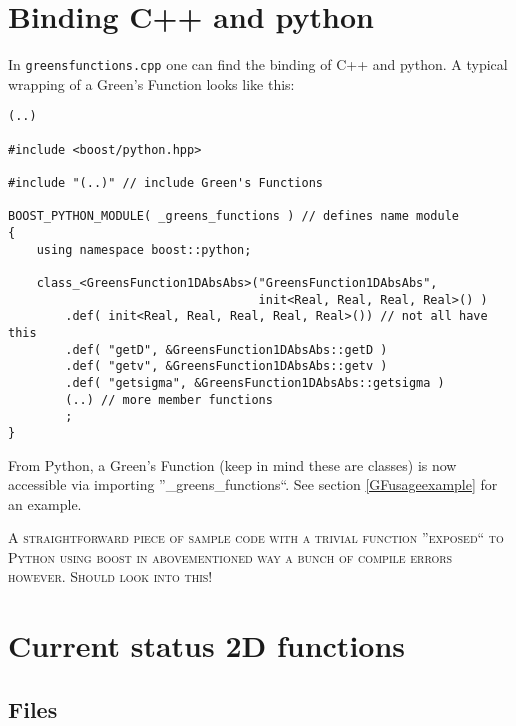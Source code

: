 \documentclass[a4paper,10pt]{article}
\begin{document}
\section{Binding C++ and python}
 
In \texttt{greensfunctions.cpp} one can find the binding of C++ and python. A typical wrapping of a Green's Function looks like this:

\begin{verbatim}
(..)

#include <boost/python.hpp>

#include "(..)" // include Green's Functions

BOOST_PYTHON_MODULE( _greens_functions ) // defines name module
{
    using namespace boost::python;

    class_<GreensFunction1DAbsAbs>("GreensFunction1DAbsAbs",
                                   init<Real, Real, Real, Real>() )
        .def( init<Real, Real, Real, Real, Real>()) // not all have this
        .def( "getD", &GreensFunction1DAbsAbs::getD )
        .def( "getv", &GreensFunction1DAbsAbs::getv )
        .def( "getsigma", &GreensFunction1DAbsAbs::getsigma )
        (..) // more member functions
        ;
}
\end{verbatim} 
 
From Python, a Green's Function (keep in mind these are classes) is now accessible via importing ''\_greens\_functions``. See section \ref{GFusageexample} for an example.

\bigskip 

\textsc{A straightforward piece of sample code with a trivial function ''exposed`` to Python using boost in abovementioned way a bunch of compile errors however. Should look into this!}

\section{Current status 2D functions}

\subsection{Files}
\end{document}
